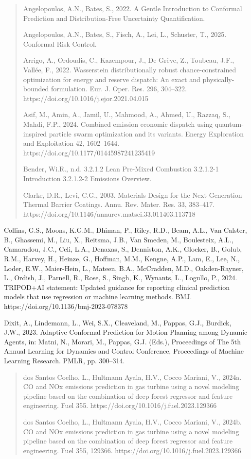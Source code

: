 \documentclass[11pt]{article}
\begin{document}
\begin{quote}
Angelopoulos, A.N., Bates, S., 2022. A Gentle Introduction to Conformal
Prediction and Distribution-Free Uncertainty Quantification.

Angelopoulos, A.N., Bates, S., Fisch, A., Lei, L., Schuster, T., 2025.
Conformal Risk Control.

Arrigo, A., Ordoudis, C., Kazempour, J., De Grève, Z., Toubeau, J.F.,
Vallée, F., 2022. Wasserstein distributionally robust chance-constrained
optimization for energy and reserve dispatch: An exact and
physically-bounded formulation. Eur. J. Oper. Res. 296, 304--322.
https://doi.org/10.1016/j.ejor.2021.04.015

Asif, M., Amin, A., Jamil, U., Mahmood, A., Ahmed, U., Razzaq, S.,
Mahdi, F.P., 2024. Combined emission economic dispatch using
quantum-inspired particle swarm optimization and its variants. Energy
Exploration and Exploitation 42, 1602--1644.
https://doi.org/10.1177/01445987241235419

Bender, Wi.R., n.d. 3.2.1.2 Lean Pre-Mixed Combustion 3.2.1.2-1
Introduction 3.2.1.2-2 Emissions Overview.

Clarke, D.R., Levi, C.G., 2003. Materials Design for the Next Generation
Thermal Barrier Coatings. Annu. Rev. Mater. Res. 33, 383--417.
https://doi.org/10.1146/annurev.matsci.33.011403.113718
\end{quote}

Collins, G.S., Moons, K.G.M., Dhiman, P., Riley, R.D., Beam, A.L., Van
Calster, B., Ghassemi, M., Liu, X., Reitsma, J.B., Van Smeden, M.,
Boulesteix, A.L., Camaradou, J.C., Celi, L.A., Denaxas, S., Denniston,
A.K., Glocker, B., Golub, R.M., Harvey, H., Heinze, G., Hoffman, M.M.,
Kengne, A.P., Lam, E., Lee, N., Loder, E.W., Maier-Hein, L., Mateen,
B.A., McCradden, M.D., Oakden-Rayner, L., Ordish, J., Parnell, R., Rose,
S., Singh, K., Wynants, L., Logullo, P., 2024. TRIPOD+AI statement:
Updated guidance for reporting clinical prediction models that use
regression or machine learning methods. BMJ.
https://doi.org/10.1136/bmj-2023-078378

Dixit, A., Lindemann, L., Wei, S.X., Cleaveland, M., Pappas, G.J.,
Burdick, J.W., 2023. Adaptive Conformal Prediction for Motion Planning
among Dynamic Agents, in: Matni, N., Morari, M., Pappas, G.J. (Eds.),
Proceedings of The 5th Annual Learning for Dynamics and Control
Conference, Proceedings of Machine Learning Research. PMLR, pp.
300--314.

\begin{quote}
dos Santos Coelho, L., Hultmann Ayala, H.V., Cocco Mariani, V., 2024a.
CO and NOx emissions prediction in gas turbine using a novel modeling
pipeline based on the combination of deep forest regressor and feature
engineering. Fuel 355. https://doi.org/10.1016/j.fuel.2023.129366

dos Santos Coelho, L., Hultmann Ayala, H.V., Cocco Mariani, V., 2024b.
CO and NOx emissions prediction in gas turbine using a novel modeling
pipeline based on the combination of deep forest regressor and feature
engineering. Fuel 355, 129366.
https://doi.org/10.1016/j.fuel.2023.129366
\end{quote}
\end{document}
